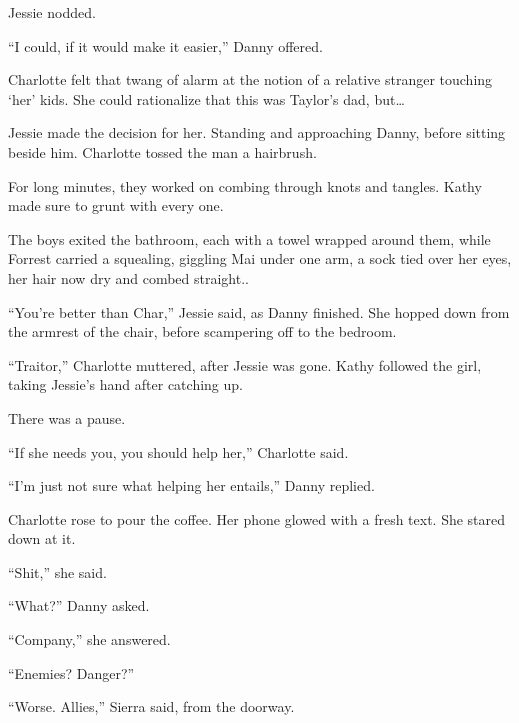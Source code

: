Jessie nodded.



``I could, if it would make it easier,'' Danny offered.



Charlotte felt that twang of alarm at the notion of a relative stranger touching `her' kids.  She could rationalize that this was Taylor's dad, but\ldots



Jessie made the decision for her.  Standing and approaching Danny, before sitting beside him.  Charlotte tossed the man a hairbrush.



For long minutes, they worked on combing through knots and tangles.  Kathy made sure to grunt with every one.



The boys exited the bathroom, each with a towel wrapped around them, while Forrest carried a squealing, giggling Mai under one arm, a sock tied over her eyes, her hair now dry and combed straight..



``You're better than Char,'' Jessie said, as Danny finished.  She hopped down from the armrest of the chair, before scampering off to the bedroom.



``Traitor,'' Charlotte muttered, after Jessie was gone.  Kathy followed the girl, taking Jessie's hand after catching up.



There was a pause.



``If she needs you, you should help her,'' Charlotte said.



``I'm just not sure what helping her entails,'' Danny replied.



Charlotte rose to pour the coffee.  Her phone glowed with a fresh text.  She stared down at it.



``Shit,'' she said.



``What?'' Danny asked.



``Company,'' she answered.



``Enemies?  Danger?''



``Worse.  Allies,'' Sierra said, from the doorway.



